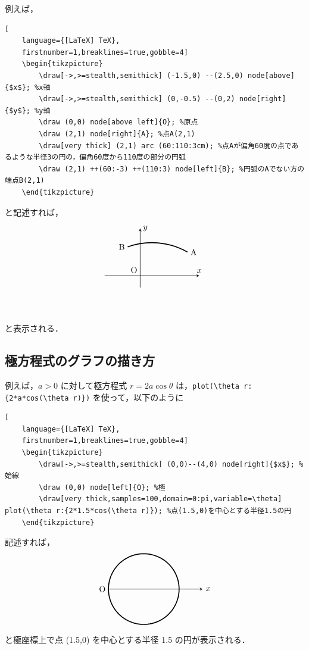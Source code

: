 \documentclass[lualatex]{jlreq}
\begin{document}
例えば，
\begin{lstlisting}[
    language={[LaTeX] TeX},
    firstnumber=1,breaklines=true,gobble=4]
    \begin{tikzpicture}
        \draw[->,>=stealth,semithick] (-1.5,0) --(2.5,0) node[above]{$x$}; %x軸
        \draw[->,>=stealth,semithick] (0,-0.5) --(0,2) node[right]{$y$}; %y軸
        \draw (0,0) node[above left]{O}; %原点
        \draw (2,1) node[right]{A}; %点A(2,1)
        \draw[very thick] (2,1) arc (60:110:3cm); %点Aが偏角60度の点であるような半径3の円の，偏角60度から110度の部分の円弧
        \draw (2,1) ++(60:-3) ++(110:3) node[left]{B}; %円弧のAでない方の端点B(2,1)
    \end{tikzpicture}
\end{lstlisting}
と記述すれば，
\[
    \begin{tikzpicture}
    \draw[->,>=stealth,semithick] (-1.5,0) --(2.5,0) node[above]{$x$}; %
    \draw[->,>=stealth,semithick] (0,-0.5) --(0,2) node[right]{$y$}; %
    \draw (0,0) node[above left]{O}; %
    \draw (2,1) node[right]{A}; %
    \draw[very thick] (2,1) arc (60:110:3cm); %
    \draw (2,1) ++(60:-3) ++(110:3) node[left]{B}; %
    \end{tikzpicture}
\]
と表示される．

\subsection{極方程式のグラフの描き方}

例えば，\(a > 0 \) に対して極方程式 \(r=2a \cos \theta \) は，\verb|plot(\theta r:{2*a*cos(\theta r)})| を使って，以下のように
\begin{lstlisting}[
    language={[LaTeX] TeX},
    firstnumber=1,breaklines=true,gobble=4]
    \begin{tikzpicture}
        \draw[->,>=stealth,semithick] (0,0)--(4,0) node[right]{$x$}; %始線
        \draw (0,0) node[left]{O}; %極
        \draw[very thick,samples=100,domain=0:pi,variable=\theta] plot(\theta r:{2*1.5*cos(\theta r)}); %点(1.5,0)を中心とする半径1.5の円
    \end{tikzpicture}
\end{lstlisting}
記述すれば，
\[
    \begin{tikzpicture}
    \draw[->,>=stealth,semithick] (0,0)--(4,0) node[right]{$x$}; %
    \draw (0,0) node[left]{O}; %
    \draw[very thick,samples=100,domain=0:pi,variable=\theta] plot(\theta r:{2*1.5*cos(\theta r)}); %
    \end{tikzpicture}
\]
と極座標上で点 (1.5,0) を中心とする半径 1.5 の円が表示される．
\end{document}
